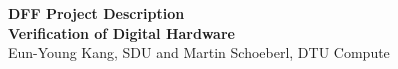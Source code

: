 \documentclass[fleqn,12pt]{article}
\begin{document}
\setlength{\baselineskip}{1.44\baselineskip}


\begin{center}
  {\LARGE\bf DFF Project Description }\\[1ex]
  {\LARGE\bf Verification of Digital Hardware}\\[1ex]
  {\large Eun-Young Kang, SDU and Martin Schoeberl, DTU Compute}\\[1ex]
 \end{center}


%

\end{document}
